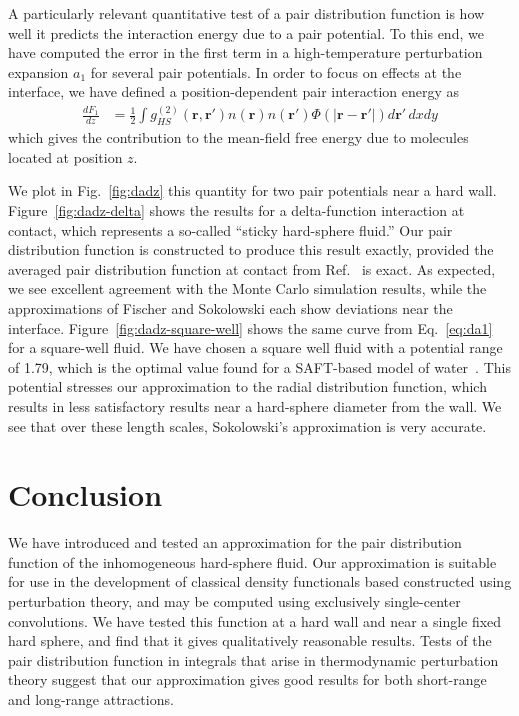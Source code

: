 \documentclass[letterpaper,twocolumn,amsmath,amssymb,pre,aps,10pt]{revtex4-1}
\newcommand{\rr}{\textbf{r}}
\begin{document}
A particularly relevant quantitative test of a pair distribution
function is how well it predicts the interaction energy due to a pair
potential.  To this end, we have computed the error in the first term
in a high-temperature perturbation expansion $a_1$ for several pair
potentials.  In order to focus on effects at the interface, we have
defined a position-dependent pair interaction energy as
\begin{align}
  \frac{dF_1}{dz} &=
  \tfrac12 \int g^{(2)}_{HS}(\rr,\rr')n(\rr)n(\rr')\Phi(|\rr-\rr'|)
  d\rr'\, dxdy\label{eq:da1}
\end{align}
which gives the contribution to the mean-field free energy due to
molecules located at position $z$.

We plot in Fig.~\ref{fig:dadz} this quantity for two pair potentials
near a hard wall.  Figure~\ref{fig:dadz-delta} shows the results for a
delta-function interaction at contact, which represents a so-called
``sticky hard-sphere fluid.''  Our pair distribution function is
constructed to produce this result exactly, provided the averaged pair
distribution function at contact from Ref.~
is exact.  As expected, we see excellent agreement with the Monte
Carlo simulation results, while the approximations of Fischer and
Sokolowski each show deviations near the interface.
Figure~\ref{fig:dadz-square-well} shows the same curve from
Eq.~\ref{eq:da1} for a square-well fluid.  We have chosen a square
well fluid with a potential range of 1.79, which is the optimal value
found for a SAFT-based model of water~\cite{clark2006developing}.
This potential stresses our approximation to the radial distribution
function, which results in less satisfactory results near a
hard-sphere diameter from the wall.  We see that over these length
scales, Sokolowski's approximation is very accurate.

\section{Conclusion}

We have introduced and tested an approximation for the pair
distribution function of the inhomogeneous hard-sphere fluid.  Our
approximation is suitable for use in the development of classical
density functionals based constructed using perturbation theory, and
may be computed using exclusively single-center convolutions.  We have
tested this function at a hard wall and near a single fixed hard
sphere, and find that it gives qualitatively reasonable results.
Tests of the pair distribution function in integrals that arise in
thermodynamic perturbation theory suggest that our approximation gives
good results for both short-range and long-range attractions.

\end{document}
